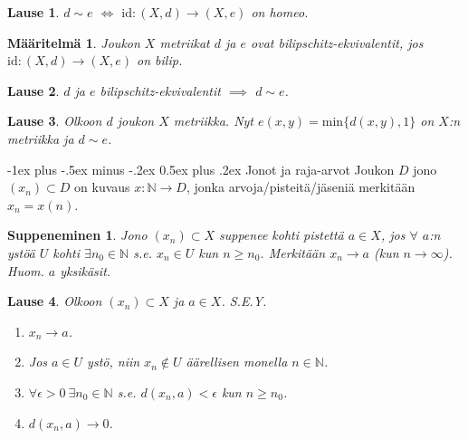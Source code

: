 \documentclass[landscape,a4paper,10pt]{article}
\makeatletter
\renewcommand{\section}{\@startsection{section}{1}{0mm}%
                                {-1ex plus -.5ex minus -.2ex}%
                                {0.5ex plus .2ex}%
                                {\color{blue}\normalfont\large\bfseries}}
\theoremstyle{customtheoremstyle}
\newtheorem*{theorem}{Lause}
\newtheorem*{definition}{Määritelmä}
\makeatother
\begin{document}
\begin{multicols*}{3}
\begin{theorem}
  $d \sim e$ $\iff$ $\text{id}: (X,d) \rightarrow (X,e)$ on homeo.
\end{theorem}

\begin{definition}
  Joukon $X$ metriikat $d$ ja $e$ ovat \emph{bilipschitz-ekvivalentit}, jos
  $\text{id}: (X,d) \rightarrow (X,e)$ on bilip.
\end{definition}

\begin{theorem}
  $d$ ja $e$ bilipschitz-ekvivalentit $\implies$ $d \sim e$.
\end{theorem}

\begin{theorem}
  Olkoon $d$ joukon $X$ metriikka. Nyt $e(x,y) = \text{min}\{d(x,y), 1\}$ on
  $X$:n metriikka ja $d \sim e$.
\end{theorem}

\section{Jonot ja raja-arvot}
Joukon $D$ jono $(x_n) \subset D$ on kuvaus $x: \mathbb{N} \rightarrow D$,
jonka arvoja/pisteitä/jäseniä merkitään $x_n = x(n)$.

\newtheorem*{defn:suppeneminen}{Suppeneminen}
\begin{defn:suppeneminen}
  Jono $(x_n) \subset X$ suppenee kohti pistettä $a \in X$, jos $\forall$ $a$:n
  ystöä $U$ kohti $\exists n_0 \in \mathbb{N}$ s.e. $x_n \in U$ kun $n \geq
  n_0$. Merkitään $x_n \rightarrow a$ (kun $n \rightarrow \infty$). Huom. $a$
  yksikäsit.
\end{defn:suppeneminen}

\begin{theorem}
  Olkoon $(x_n) \subset X$ ja $a \in X$. S.E.Y.
  \begin{enumerate}
    \item{$x_n \rightarrow a$.}
    \item{Jos $a \in U$ ystö, niin $x_n \not\in U$ äärellisen monella $n \in
      \mathbb{N}$.}
    \item{$\forall \epsilon > 0 \: \exists n_0 \in \mathbb{N}$ s.e. $d(x_n, a) <
      \epsilon$ kun $n \geq n_0$.}
    \item{$d(x_n, a) \rightarrow 0$.}
  \end{enumerate}
\end{theorem}


\end{multicols*}
\end{document}
